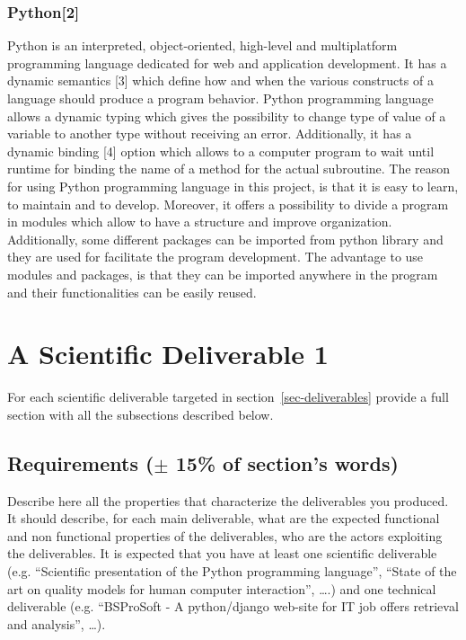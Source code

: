 \documentclass[conference,compsoc]{IEEEtran}
\begin{document}
\subsubsection{Python[2]}
Python is an interpreted, object-oriented, high-level and multiplatform programming language dedicated for web and application development. It has a dynamic semantics [3] which define how and when the various constructs of a language should produce a program behavior.                                                                                                                                                   Python programming language allows a dynamic typing which gives the possibility to change type of value of a variable to another type without receiving an error. Additionally, it has a dynamic binding [4] option which allows to a computer program to wait until runtime for binding the name of a method for the actual subroutine.                                                                                                                                         The reason for using Python programming language in this project, is that it is easy to learn, to maintain and to develop. Moreover, it offers a possibility to divide a program in modules which allow to have a structure and improve organization. Additionally, some different packages can be imported from python library and they are used for facilitate the program development. The advantage to use modules and packages, is that they can be imported anywhere in the program and their functionalities can be easily reused. 

\section{ A Scientific Deliverable 1}
For each scientific deliverable targeted in section~\ref{sec-deliverables} provide a full section with all the subsections described below.
\label{sec-production}
\subsection{Requirements ($\pm$ 15\% of section's words)}
Describe here all the properties that characterize the deliverables you produced. It should describe, for each main deliverable, what are the expected functional and non functional properties of the deliverables, who are the actors exploiting the deliverables. It is expected that you have at least one scientific deliverable (e.g. ``Scientific presentation of the Python programming language'', ``State of the art on quality models for human computer interaction'', \ldots.) and one technical deliverable (e.g. ``BSProSoft - A python/django web-site for IT job offers retrieval and analysis'', \ldots). 
\end{document}
